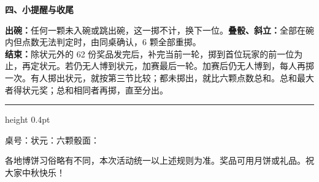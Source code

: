 \documentclass[11pt,a4paper,fontset=none]{ctexart}
\newcommand{\shead}[2]{\par\vspace{7pt}%
  {\fontsize{12.5}{17}\selectfont\bfseries\sffamily
  #1、#2\hspace{10pt}{\color{rulegray}\leaders\hrule height 0.3pt\hfill}\kern0pt\par}\vspace{4pt}}
\begin{document}
\shead{四}{小提醒与收尾}
\textbf{出碗：}任何一颗未入碗或跳出碗，这一掷不计，换下一位。\textbf{叠骰、斜立：}全部在碗内但点数无法判定时，由同桌确认，6 颗全部重掷。\\
\textbf{结束：}除状元外的 62 份奖品发完后，补完当前一轮，掷到首位玩家的前一位为止，再定状元。若仍无人博到状元，加赛最后一轮。加赛后仍无人博到，每人再掷一次。有人掷出状元，就按第三节比较；都未掷出，就比六颗点数总和。总和最大者得状元奖；总和相同者再掷，直至分出。

\vspace{7pt}\hrule height 0.4pt\vspace{5pt}
{\fontsize{10}{15}\selectfont
桌号：\underline{\hspace{1.2cm}}\quad 状元：\underline{\hspace{2.4cm}}\quad 六颗骰面：\underline{\hspace{3.4cm}}\par}
\vspace{3pt}
{\fontsize{9}{12}\selectfont 各地博饼习俗略有不同，本次活动统一以上述规则为准。奖品可用月饼或礼品。祝大家中秋快乐！\par}
\end{document}
